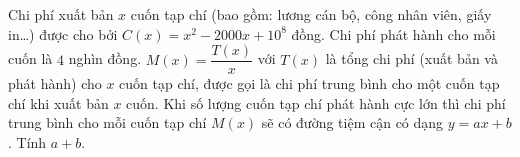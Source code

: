 \begin{bt}%
Chi phí xuất bản $x$ cuốn tạp chí (bao gồm: lương cán bộ, công nhân viên, giấy in\ldots) được cho bởi $C(x)=x^2-2000 x+10^8$ đồng. Chi phí phát hành cho mỗi cuốn là $4$ nghìn đồng. $M(x)=\dfrac{T(x)}{x}$ với $T(x)$ là tổng chi phí (xuất bản và phát hành) cho $x$ cuốn tạp chí, được gọi là chi phí trung bình cho một cuốn tạp chí khi xuất bản $x$ cuốn. Khi số lượng cuốn tạp chí phát hành cực lớn thì chi phí trung bình cho mỗi cuốn tạp chí $M(x)$ sẽ có đường tiệm cận có dạng $y=ax+b$. Tính $a+b$.
\end{bt}

